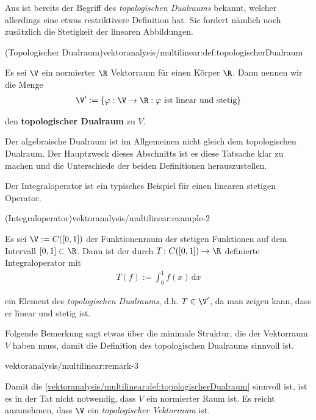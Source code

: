 \documentclass[letterpaper,10pt,english]{jupyterBook}
\begin{document}
\par
Aus \cite{Ten21} ist bereits der Begriff des \emph{topologischen Dualraums} bekannt, welcher allerdings eine etwas restriktivere Definition hat.
Sie fordert nämlich noch zusätzlich die Stetigkeit der linearen Abbildungen.
\begin{definition}{(Topologischer Dualraum)}{vektoranalysis/multilinear:def:topologischerDualraum}



\par
Es sei \(\V\) ein normierter \(\R\) Vektorraum für einen Körper \(\R\).
Dann nennen wir die Menge
\begin{align*}
\V^\prime := \{\varphi:\V\rightarrow\R: \varphi\text{ ist linear und stetig}\}
\end{align*}
\par
den \textbf{topologischer Dualraum} zu \(V\).
\end{definition}

\begin{emphBox}{}{}
\par
Der algebraische Dualraum ist im Allgemeinen nicht gleich dem topologischen Dualraum.
Der Hauptzweck dieses Abschnitts ist es diese Tatsache klar zu machen und die Unterschiede der beiden Definitionen herauszustellen.
\end{emphBox}

\par
Der Integraloperator ist ein typisches Beispiel für einen linearen stetigen Operator.
\begin{example}{(Integraloperator)}{vektoranalysis/multilinear:example-2}



\par
Es sei \(\V := C([0,1])\) der Funktionenraum der stetigen Funktionen auf dem Intervall \([0,1] \subset \R\).
Dann ist der durch \(T \colon C([0,1]) \rightarrow \R\) definierte Integraloperator mit
\begin{align*}
T(f) := \int_0^1 f(x) \, \mathrm{d}x
\end{align*}
\par
ein Element des \emph{topologischen Dualraums}, d.h. \(T \in \V^\prime\), da man zeigen kann, dass er linear und stetig ist.
\end{example}

\par
Folgende Bemerkung sagt etwas über die minimale Struktur, die der Vektorraum \(V\) haben muss, damit die Definition des topologischen Dualraums sinnvoll ist.
\begin{remark}{}{vektoranalysis/multilinear:remark-3}



\par
Damit die \cref{vektoranalysis/multilinear:def:topologischerDualraum} sinnvoll ist, ist es in der Tat nicht notwendig, dass \(V\) ein normierter Raum ist. Es reicht anzunehmen, dass \(\V\) ein \emph{topologischer Vektorraum} ist.
\end{remark}
\end{document}
